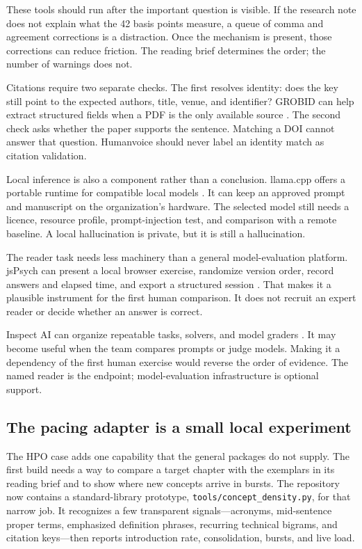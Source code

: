 \hvFigureNarrowEvidence

These tools should run after the important question is visible. If the research
note does not explain what the 42 basis points measure, a queue of comma and
agreement corrections is a distraction. Once the mechanism is present, those
corrections can reduce friction. The reading brief determines the order; the
number of warnings does not.

\Needspace{13cm}
Citations require two separate checks. The first resolves identity: does the
key still point to the expected authors, title, venue, and identifier? GROBID
can help extract structured fields when a PDF is the only available source
\citep{grobid2026}. The second check asks whether the paper supports the
sentence. Matching a DOI cannot answer that question. Humanvoice should never
label an identity match as citation validation.

Local inference is also a component rather than a conclusion. llama.cpp offers
a portable runtime for compatible local models \citep{llamacpp2026}. It can
keep an approved prompt and manuscript on the organization's hardware. The
selected model still needs a licence, resource profile, prompt-injection test,
and comparison with a remote baseline. A local hallucination is private, but it
is still a hallucination.

The reader task needs less machinery than a general model-evaluation platform.
jsPsych can present a local browser exercise, randomize version order, record
answers and elapsed time, and export a structured session
\citep{jspsych2026}. That makes it a plausible instrument for the first human
comparison. It does not recruit an expert reader or decide whether an answer is
correct.

Inspect AI can organize repeatable tasks, solvers, and model graders
\citep{inspectai2026}. It may become useful when the team compares prompts or
judge models. Making it a dependency of the first human exercise would reverse
the order of evidence. The named reader is the endpoint; model-evaluation
infrastructure is optional support.

\subsection{The pacing adapter is a small local experiment}
\label{sec:component-pacing-adapter}

The HPO case adds one capability that the general packages do not supply. The
first build needs a way to compare a target chapter with the exemplars in its
reading brief and to show where new concepts arrive in bursts. The repository
now contains a standard-library prototype, \texttt{tools/concept\_density.py},
for that narrow job. It recognizes a few transparent signals---acronyms,
mid-sentence proper terms, emphasized definition phrases, recurring technical
bigrams, and citation keys---then reports introduction rate, consolidation,
bursts, and live load.

